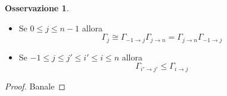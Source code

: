\documentclass[a4paper,12pt]{report}
\theoremstyle{plain}
\theoremstyle{definition}
\newtheorem{oss}[teo]{Osservazione}
\begin{document}
\begin{oss}
\label{oss:StabilizerFactorsAsSectionSubgroups}
\begin{itemize}
\item Se $0\leq j\leq n-1$ allora
\begin{equation*}
\Gamma_j\cong\Gamma_{-1\rightarrow j}\Gamma_{j\rightarrow n}=\Gamma_{j\rightarrow n}\Gamma_{-1\rightarrow j}
\end{equation*}
\item Se $-1\leq j\leq j'\leq i'\leq i\leq n$ allora
\begin{equation*}
\Gamma_{i'\rightarrow j'}\leq\Gamma_{i\rightarrow j}
\end{equation*}
\end{itemize}
\end{oss}
\begin{proof}
Banale
\end{proof}
\end{document}

